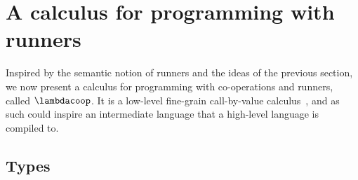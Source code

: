 

\newcommand{\tmcoop}[3]{\mathtt{\overline{#1}}~#2 \mapsto #3}

\section{A calculus for programming with runners}
\label{sect:corecalculus}

Inspired by the semantic notion of runners and the ideas of the previous
section, we now present a calculus for programming with co-operations and
runners, called $\lambdacoop$. It is a low-level fine-grain call-by-value
calculus~\cite{Levy:CBPV}, and as such could inspire an intermediate language
that a high-level language is compiled to.

\subsection{Types}
\label{sect:types}

